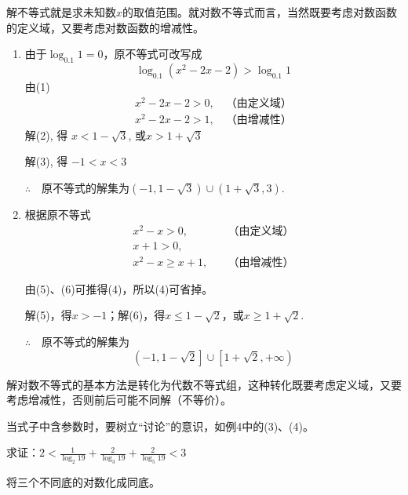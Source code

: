 \begin{analyze}
    解不等式就是求未知数$x$的取值范围。就对数不等式而言，当然既要考虑对数函数的定义域，又要考虑对数函数的增减性。
\end{analyze}

\begin{solution}
\begin{enumerate}[(1)]
    \item 由于$\log_{0.1}1=0$，原不等式可改写成
\begin{equation}
    \log_{0.1}(x^2-2x-2)>\log_{0.1}1   \tag{1}
\end{equation}
由(1)
\begin{align}
    x^2-2x-2>0, \quad \text{（由定义域）} \tag{2}\\
    x^2-2x-2>1, \quad \text{（由增减性）} \tag{3}
\end{align}
解(2), 得 $x<1-\sqrt{3}$, 或$x>1+\sqrt{3}$

解(3), 得 $-1<x<3$

$\therefore\quad $原不等式的解集为$(-1,1-\sqrt{3})\cup (1+\sqrt{3},3)$.

\item 根据原不等式
\begin{align}
    x^2-x>0,&\quad \text{（由定义域）} \tag{4}\\
    x+1>0,&\tag{5}\\
    x^2-x\ge x+1,&\quad \text{（由增减性）} \tag{6}
\end{align}

由(5)、(6)可推得(4)，所以(4)可省掉。

解(5)，得$x>-1$；解(6)，得$x\le 1-\sqrt{2}$，或$x\ge 1+\sqrt{2}$.

$\therefore\quad $原不等式的解集为
\[\left(-1,1-\sqrt{2}\right]\cup \left[1+\sqrt{2},+\infty\right)\]
\end{enumerate}
\end{solution}

\begin{note}
    解对数不等式的基本方法是转化为代数不等式组，这种转化既要考虑定义域，又要考虑增减性，否则前后可能不同解（不等价）。

    当式子中含参数时，要树立“讨论”的意识，如例4中的(3)、(4)。
\end{note}

\begin{example}
求证：$2<\frac{1}{\log_2 19}+\frac{2}{\log_3 19}+\frac{2}{\log_5 19}<3$
\end{example}

\begin{analyze}
    将三个不同底的对数化成同底。
\end{analyze}

